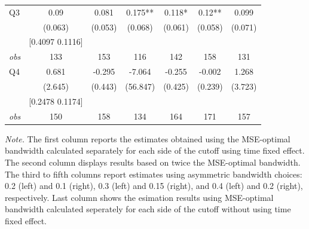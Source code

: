 \begin{table}[]
{\begin{tabular}{lcccccc}
Q3 & 0.09 & 0.081 & 0.175** & 0.118* & 0.12** & 0.099 \\ 
&(0.063)&(0.053) & (0.068)&(0.061)&(0.058)&(0.071)\\ 
& [0.4097 0.1116] & & & & & \\ 
\textit{obs} & 133 & 153 & 116 & 142 & 158 & 131 \\ 
Q4 & 0.681 & -0.295 & -7.064 & -0.255 & -0.002 & 1.268 \\ 
&(2.645)&(0.443) & (56.847)&(0.425)&(0.239)&(3.723)\\ 
& [0.2478 0.1174] & & & & & \\ 
\textit{obs} & 150 & 158 & 134 & 164 & 171 & 157 \\ 
\hline 
 \end{tabular}}{\textit{Note.} The first column reports the estimates obtained using the MSE-optimal bandwidth calculated separately for each side of the cutoff using time fixed effect. The second column displays results based on twice the MSE-optimal bandwidth. The third to fifth columns report estimates using asymmetric bandwidth choices: 0.2 (left) and 0.1 (right), 0.3 (left) and 0.15 (right), and 0.4 (left) and 0.2 (right), respectively. Last column shows the esimation results using MSE-optimal bandwidth calculated seperately for each side of the cutoff without using time fixed effect.}
\end{table}
